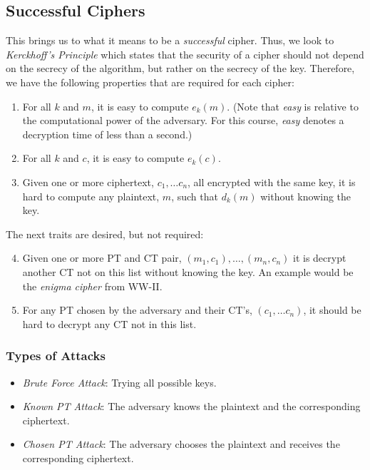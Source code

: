\subsection{Successful Ciphers}

This brings us to what it means to be a \textit{successful} cipher. Thus, we look to \textit{Kerckhoff's Principle} which states that the security of a cipher should not depend on the secrecy of the algorithm, but rather on the secrecy of the key. Therefore, we have the following properties that are required for each cipher:
\begin{enumerate}[label=\arabic*.]
    \item For all \(k\) and \(m\), it is easy to compute \(e_k(m)\). (Note that \textit{easy} is relative to the computational power of the adversary. For this course, \textit{easy} denotes a decryption time of less than a second.)
    \item For all \(k\) and \(c\), it is easy to compute \(e_k(c)\).
    \item Given one or more ciphertext, \(c_1,\dots c_n\), all encrypted with the same key, it is hard to compute any plaintext, \(m\), such that \(d_k(m)\) without knowing the key.
\end{enumerate}

The next traits are desired, but not required:

\begin{enumerate}[label=\arabic*.]
    \setcounter{enumi}{3}
    \item Given one or more PT and CT pair, \((m_1,c_1),\dots,(m_n,c_n)\) it is decrypt another CT not on this list without knowing the key. An example would be the \textit{enigma cipher} from WW-II\@.
    \item For any PT chosen by the adversary and their CT's, \((c_1,\dots c_n)\), it should be hard to decrypt any CT not in this list.
\end{enumerate}

\begin{center}
    \subsubsection{Types of Attacks}
\end{center}

\begin{itemize}
    \item \textit{Brute Force Attack}: Trying all possible keys.
    \item \textit{Known PT Attack}: The adversary knows the plaintext and the corresponding ciphertext.
    \item \textit{Chosen PT Attack}: The adversary chooses the plaintext and receives the corresponding ciphertext.
\end{itemize}

